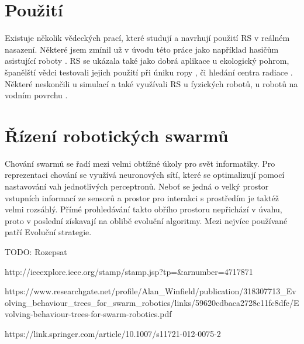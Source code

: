 \section{Použití}
Existuje několik vědeckých prací, které studují a navrhují použití RS v reálném nasazení. Některé jsem zmínil už v úvodu této práce jako například hasičům asistující roboty \citep{fireRobots}. RS se ukázala také jako dobrá aplikace u ekologický pohrom, španělští vědci testovali jejich použití při úniku ropy \citep{oilSwarm}, či hledání centra radiace \citep{radiationSwarm}. Některé neskončili u simulací a také využívali RS u fyzických robotů, u robotů na vodním povrchu \citep{aquaticRobots}. \par
\section{Řízení robotických swarmů}
Chování swarmů se řadí mezi velmi obtížné úkoly pro svět informatiky. Pro reprezentaci chování se využívá neuronových sítí, které se optimalizují pomocí nastavování vah jednotlivých perceptronů. Neboť se jedná o velký prostor vstupních informací ze sensorů a prostor pro interakci s prostředím je taktéž velmi rozsáhlý. Přímé prohledávání takto obřího prostoru nepřichází v úvahu, proto v poslední získavají na oblibě evoluční algoritmy. Mezi nejvíce používané patří Evoluční strategie. \par 
TODO: Rozepsat \par
http://ieeexplore.ieee.org/stamp/stamp.jsp?tp=&arnumber=4717871 \par
https://www.researchgate.net/profile/Alan_Winfield/publication/318307713_Evolving_behaviour_trees_for_swarm_robotics/links/59620cdbaca2728c11fc8dfe/Evolving-behaviour-trees-for-swarm-robotics.pdf \par
https://link.springer.com/article/10.1007/s11721-012-0075-2 \par

